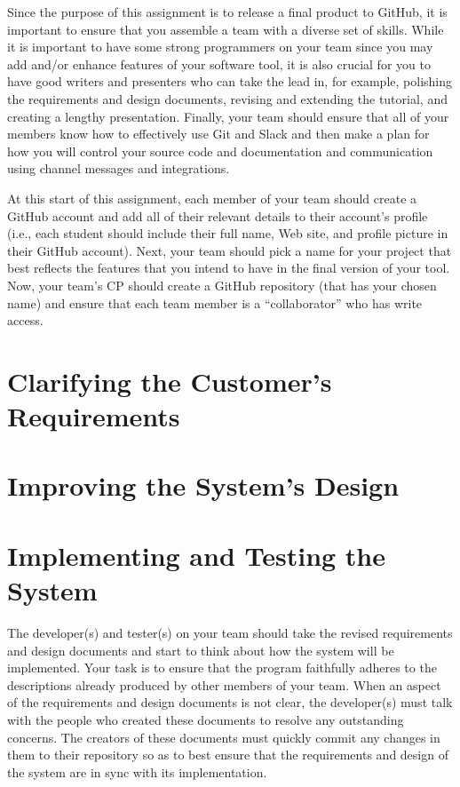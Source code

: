 Since the purpose of this assignment is to release a final product to GitHub, it is important to ensure that you
assemble a team with a diverse set of skills. While it is important to have some strong programmers on your team since
you may add and/or enhance features of your software tool, it is also crucial for you to have good writers and
presenters who can take the lead in, for example, polishing the requirements and design documents, revising and
extending the tutorial, and creating a lengthy presentation.  Finally, your team should ensure that all of your members
know how to effectively use Git and Slack and then make a plan for how you will control your source code and
documentation and communication using channel messages and integrations.

At this start of this assignment, each member of your team should create a GitHub account and add all of their relevant
details to their account's profile (i.e., each student should include their full name, Web site, and profile picture in
their GitHub account).  Next, your team should pick a name for your project that best reflects the features that you
intend to have in the final version of your tool. Now, your team's CP should create a GitHub repository (that has your
chosen name) and ensure that each team member is a ``collaborator'' who has write access.

\section*{Clarifying the Customer's Requirements}


\section*{Improving the System's Design}


\section*{Implementing and Testing the System}

The developer(s) and tester(s) on your team should take the revised requirements and design documents and start to think
about how the system will be implemented. Your task is to ensure that the program faithfully adheres to the descriptions
already produced by other members of your team. When an aspect of the requirements and design documents is not clear,
the developer(s) must talk with the people who created these documents to resolve any outstanding concerns. The creators
of these documents must quickly commit any changes in them to their repository so as to best ensure that the
requirements and design of the system are in sync with its implementation.

